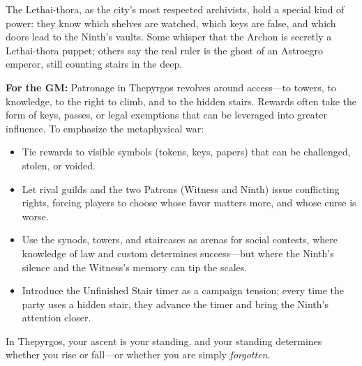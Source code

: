 \begin{tcolorbox}[colback=black!3,colframe=black!40!white,title={Patronage \& Power},breakable]
The Lethai-thora, as the city's most respected archivists, hold a special kind of power: they know which shelves are watched, which keys are false, and which doors lead to the Ninth's vaults. Some whisper that the Archon is secretly a Lethai-thora puppet; others say the real ruler is the ghost of an Astroegro emperor, still counting stairs in the deep.

\textbf{For the GM:}  
Patronage in Thepyrgos revolves around access---to towers, to knowledge, to the right to climb, and to the hidden stairs. Rewards often take the form of keys, passes, or legal exemptions that can be leveraged into greater influence. To emphasize the metaphysical war:
\begin{itemize}
\item Tie rewards to visible symbols (tokens, keys, papers) that can be challenged, stolen, or voided.
\item Let rival guilds and the two Patrons (Witness and Ninth) issue conflicting rights, forcing players to choose whose favor matters more, and whose curse is worse.
\item Use the synods, towers, and staircases as arenas for social contests, where knowledge of law and custom determines success---but where the Ninth's silence and the Witness's memory can tip the scales.
\item Introduce the Unfinished Stair timer as a campaign tension; every time the party uses a hidden stair, they advance the timer and bring the Ninth's attention closer.
\end{itemize}
In Thepyrgos, your ascent is your standing, and your standing determines whether you rise or fall---or whether you are simply \emph{forgotten}.
\end{tcolorbox}

